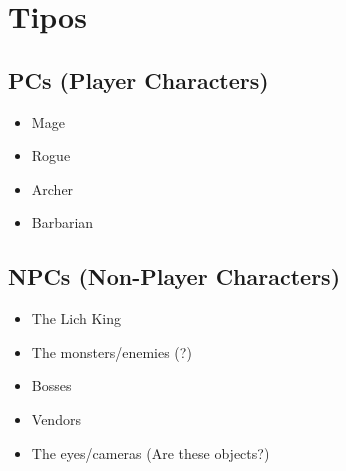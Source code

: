 \section{Tipos} %

\subsection{PCs (Player Characters)} %

\begin{itemize} %
    \item Mage       %
    \item Rogue      %
    \item Archer     %
    \item Barbarian  %
\end{itemize}

\subsection{NPCs (Non-Player Characters)} %


\begin{itemize}
    \item The Lich King %
    \item The monsters/enemies (?)
    \item Bosses
    \item Vendors
    \item The eyes/cameras (Are these objects?)
\end{itemize}